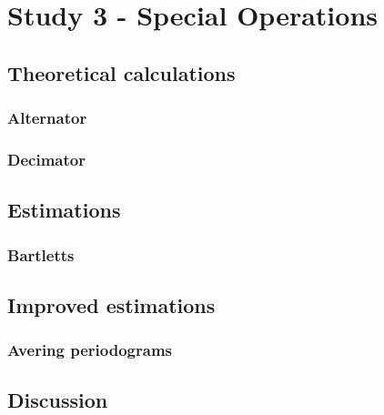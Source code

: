 
\section{Study 3 - Special Operations}


\subsection{Theoretical calculations}


\subsubsection{Alternator}


\subsubsection{Decimator}


\subsection{Estimations}


\subsubsection{Bartletts}


\subsection{Improved estimations}


\subsubsection{Avering periodograms}


\subsection{Discussion}
